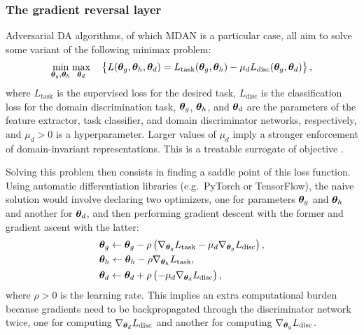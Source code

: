 \subsubsection{The gradient reversal layer}
\label{sec:da_sensors_grad_rev}
Adversarial DA algorithms, of which MDAN is a particular case, all aim to solve some variant of the following minimax problem:
\begin{equation}
	\min_{{\bm{\theta}}_g, {\bm{\theta}}_h} \max_{{\bm{\theta}}_d} \quad \left \lbrace L({\bm{\theta}}_g, {\bm{\theta}}_h, {\bm{\theta}}_d) =  L_{\text{task}}({\bm{\theta}}_g, {\bm{\theta}}_h) - \mu_d L_{\text{disc}}({\bm{\theta}}_g, {\bm{\theta}}_d) \right \rbrace,
\end{equation}
where $L_{\text{task}}$ is the supervised loss for the desired task, $L_{\text{disc}}$ is the classification loss for the domain discrimination task, ${\bm{\theta}}_g$, ${\bm{\theta}}_h$, and ${\bm{\theta}}_d$ are the parameters of the feature extractor, task classifier, and domain discriminator networks, respectively, and $\mu_d > 0$ is a hyperparameter. Larger values of $\mu_d$ imply a stronger enforcement of domain-invariant representations. This is a treatable surrogate of objective .

Solving this problem then consists in finding a saddle point of this loss function. Using automatic differentiation libraries (e.g.\ PyTorch or TensorFlow), the naive solution would involve declaring two optimizers, one for parameters ${\bm{\theta}}_g$ and ${\bm{\theta}}_h$ and another for ${\bm{\theta}}_d$, and then performing gradient descent with the former and gradient ascent with the latter:
\begin{align}
	&{\bm{\theta}}_g \leftarrow {\bm{\theta}}_g - \rho \left(\nabla_{{\bm{\theta}}_g}L_{\text{task}} - \mu_d \nabla_{{\bm{\theta}}_g} L_{\text{disc}}\right), \label{eq:grad_feature_extractor}\\
	&{\bm{\theta}}_h \leftarrow {\bm{\theta}}_h - \rho \nabla_{{\bm{\theta}}_h}L_{\text{task}}, \label{eq:grad_task_class}\\
	&{\bm{\theta}}_d \leftarrow {\bm{\theta}}_d + \rho \left(-\mu_d \nabla_{{\bm{\theta}}_d}L_{\text{disc}}\right), \label{eq:grad_discriminator}
\end{align}
where $\rho>0$ is the learning rate. This implies an extra computational burden because gradients need to be backpropagated through the discriminator network twice, one for computing $\nabla_{{\bm{\theta}}_d} L_{\text{disc}}$ and another for computing $\nabla_{{\bm{\theta}}_g} L_{\text{disc}}$.

